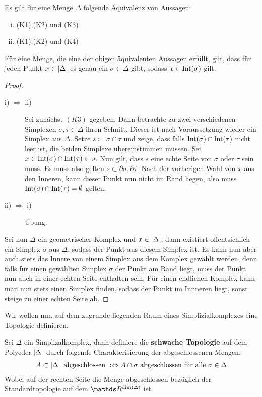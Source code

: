 \begin{Lem}\label{lem:eindeutigSimplex}
  Es gilt für eine Menge $\Delta$ folgende Äquivalenz von Aussagen:
  \begin{enumerate}[(i)]
  \item (K1),(K2) und (K3)
  \item (K1),(K2) und (K4)
  \end{enumerate}
  Für eine Menge, die eine der obigen äquivalenten Aussagen erfüllt,
  gilt, dass für jeden Punkt $x \in \left| \Delta \right|$ es genau ein
  $\sigma \in \Delta$ gibt, sodass $x \in \operatorname{Int}(\sigma)$ gilt.
  \begin{proof}
    \begin{description}
    \item[i) $\Rightarrow$ ii)] Sei zunächst $(K3)$ gegeben. Dann
      betrachte zu zwei verschiedenen Simplexen
      $\sigma,\tau \in \Delta$ ihren Schnitt. Dieser ist nach
      Voraussetzung wieder ein Simplex aus $\Delta$. Setze
      $s \coloneqq \sigma \cap \tau$ und zeige, dass falls
      $\operatorname{Int}(\sigma) \cap \operatorname{Int}(\tau)$ nicht leer ist, die beiden
      Simplexe übereinstimmen müssen. Sei
      $x \in \operatorname{Int}(\sigma) \cap \operatorname{Int}(\tau) \subset s$. Nun gilt, dass
      $s$ eine echte Seite von $\sigma$ oder $\tau$ sein muss. Es muss
      also gelten $s \subset \partial\sigma , \partial\tau$. Nach der
      vorherigen Wahl von $x$ aus den Inneren, kann dieser Punkt nun
      nicht im Rand liegen, also muss
      $\operatorname{Int}(\sigma) \cap \operatorname{Int}(\tau) = \emptyset$ gelten.
      \item[ii) $\Rightarrow$ i)] Übung.
    \end{description}
    Sei nun $\Delta$ ein geometrischer Komplex und
    $x \in \left| \Delta \right|$, dann existiert offentsichlich ein Simplex
    $\sigma$ aus $\Delta$, sodass der Punkt aus diesem Simplex
    ist. Es kann nun aber auch stets das Innere von einem Simplex aus
    dem Komplex gewählt werden, denn falls für einen gewählten Simplex
    $\sigma$ der Punkt am Rand liegt, muss der Punkt nun auch in einer
    echten Seite enthalten sein. Für einen endlichen Komplex kann man
    nun stets einen Simplex finden, sodass der Punkt im Innneren
    liegt, sonst steige zu einer echten Seite ab.
  \end{proof}
\end{Lem}


Wir wollen nun auf dem zugrunde liegenden Raum eines
Simplizialkomplexes eine Topologie definieren.

\begin{Def}
	Sei $\Delta$ ein Simplizalkomplex, dann definiere die
	\textbf{schwache Topologie} auf dem Polyeder $\left| \Delta \right|$
	durch folgende Charakterisierung der abgeschlossenen Mengen.
	\begin{gather*}
          A \subset \left| \Delta \right| \text{ abgeschlossen }
          :\Leftrightarrow A \cap \sigma \text{ abgeschlossen für alle
          } \sigma \in \Delta
	\end{gather*}
	Wobei auf der rechten Seite die Menge abgeschlossen bezüglich der
	Standardtopologie auf dem $\R^{\dim(\Delta)}$ ist.
\end{Def}

